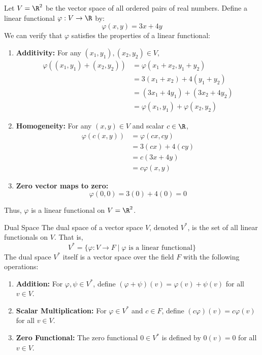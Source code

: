 \documentclass[openany]{book}
\begin{document}
\begin{example}
Let $V = \R^2$ be the vector space of all ordered pairs of real numbers. Define a linear functional $\varphi: V \to \R$ by:
$$\varphi(x, y) = 3x + 4y$$
We can verify that $\varphi$ satisfies the properties of a linear functional:
\begin{enumerate}
    \item \textbf{Additivity:} For any $(x_1, y_1), (x_2, y_2) \in V$,
    \[\begin{aligned}
    \varphi((x_1, y_1) + (x_2, y_2)) &= \varphi(x_1 + x_2, y_1 + y_2) \\
    &= 3(x_1 + x_2) + 4(y_1 + y_2) \\
    &= (3x_1 + 4y_1) + (3x_2 + 4y_2) \\
    &= \varphi(x_1, y_1) + \varphi(x_2, y_2)
    \end{aligned}\]
    \item \textbf{Homogeneity:} For any $(x, y) \in V$ and scalar $c \in \R$,
    \[\begin{aligned}
    \varphi(c(x, y)) &= \varphi(cx, cy) \\
    &= 3(cx) + 4(cy) \\
    &= c(3x + 4y) \\
    &= c\varphi(x, y)
    \end{aligned}\]
    \item \textbf{Zero vector maps to zero:} 
    $$\varphi(0, 0) = 3(0) + 4(0) = 0$$
\end{enumerate}
Thus, $\varphi$ is a linear functional on $V = \R^2$.
\end{example}
\begin{mydefinition}{Dual Space}
The dual space of a vector space $V$, denoted $V^*$, is the set of all linear functionals on $V$. That is,
$$V^* = \{\varphi: V \to F \mid \varphi \text{ is a linear functional}\}$$
The dual space $V^*$ itself is a vector space over the field $F$ with the following operations:
\begin{enumerate}
    \item \textbf{Addition:} For $\varphi, \psi \in V^*$, define $(\varphi + \psi)(v) = \varphi(v) + \psi(v)$ for all $v \in V$.
    \item \textbf{Scalar Multiplication:} For $\varphi \in V^*$ and $c \in F$, define $(c\varphi)(v) = c\varphi(v)$ for all $v \in V$.
    \item \textbf{Zero Functional:} The zero functional $0 \in V^*$ is defined by $0(v) = 0$ for all $v \in V$.
\end{enumerate}
\end{mydefinition}
\end{document}
